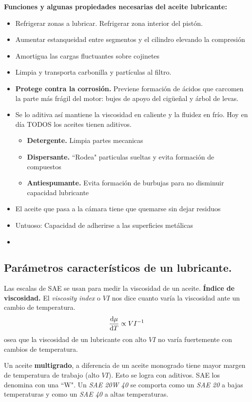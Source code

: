 {\bf Funciones y algunas propiedades necesarias del aceite lubricante:}%
\begin{itemize}
\item Refrigerar zonas a lubricar. Refrigerar zona interior del pistón.
\item Aumentar estanqueidad entre segmentos y el cilindro elevando la compresión
\item Amortigua las cargas fluctuantes sobre cojinetes
\item Limpia y transporta carbonilla y partículas al filtro.
\item \textbf{Protege contra la corrosión.} Previene formación de ácidos que carcomen la parte más frágil del motor: bujes de apoyo del cigüeñal y árbol de levas.
\item Se lo aditiva así mantiene la viscosidad en caliente y la fluidez en frío. Hoy en día TODOS los aceites tienen aditivos.
\begin{itemize}
    \item \textbf{Detergente.} Limpia partes mecanicas
    \item \textbf{Dispersante.} ``Rodea" particulas sueltas y evita formación de compuestos
    \item \textbf{Antiespumante.} Evita formación de burbujas para no disminuir capacidad lubricante
\end{itemize}
\item El aceite que pasa a la cámara tiene que quemarse sin dejar residuos
\item Untuoso: Capacidad de adherirse a las superficies metálicas
\item 
\end{itemize}

\subsection{Parámetros característicos de un lubricante.}
Las escalas de SAE se usan para medir la viscosidad de un aceite.
{\bf Índice de viscosidad.}
El \emph{viscosity index} o $VI$ nos dice cuanto varía la viscosidad ante un cambio de temperatura.
\[
\frac{\textrm{d} \mu}{\textrm{d} T}\propto VI^{-1}
\]
osea que la viscosidad de un lubricante con alto $VI$ no varía fuertemente con cambios de temperatura.

Un aceite \textbf{multigrado}, a diferencia de un aceite monogrado tiene mayor margen de temperatura de trabajo (alto $VI$). Esto se logra con aditivos. SAE los denomina con una ``W". Un \textit{SAE 20W 40} se comporta como un \textit{SAE 20} a bajas temperaturas y como un \textit{SAE 40} a altas temperaturas.


